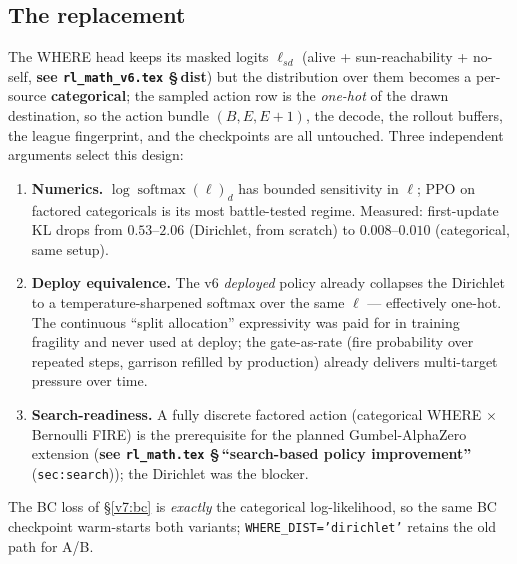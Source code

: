 \documentclass[11pt]{article}
\newcommand{\softmax}{\operatorname{softmax}}
\newcommand{\cd}[1]{\texttt{#1}}
\newcommand{\rlref}[2]{\textbf{see \texttt{rl\_math.tex} \S\,``#1''} (\texttt{#2})}
\newcommand{\vsixref}[1]{\textbf{see \texttt{rl\_math\_v6.tex} \S\,#1}}
\begin{document}
\subsection{The replacement}
The WHERE head keeps its masked logits $\ell_{sd}$ (alive + sun-reachability + no-self,
\vsixref{dist}) but the distribution over them becomes a per-source \textbf{categorical};
the sampled action row is the \emph{one-hot} of the drawn destination, so the action bundle
$(B,E,E{+}1)$, the decode, the rollout buffers, the league fingerprint, and the checkpoints are all
untouched. Three independent arguments select this design:
\begin{enumerate}[leftmargin=2em]
\item \textbf{Numerics.} $\log\softmax(\ell)_{d}$ has bounded sensitivity in $\ell$; PPO on
factored categoricals is its most battle-tested regime. Measured: first-update KL drops from
$0.53$--$2.06$ (Dirichlet, from scratch) to $0.008$--$0.010$ (categorical, same setup).
\item \textbf{Deploy equivalence.} The v6 \emph{deployed} policy already collapses the Dirichlet to
a temperature-sharpened softmax over the same $\ell$ --- effectively one-hot. The continuous
``split allocation'' expressivity was paid for in training fragility and never used at deploy; the
gate-as-rate (fire probability over repeated steps, garrison refilled by production) already
delivers multi-target pressure over time.
\item \textbf{Search-readiness.} A fully discrete factored action (categorical WHERE $\times$
Bernoulli FIRE) is the prerequisite for the planned Gumbel-AlphaZero extension
(\rlref{search-based policy improvement}{sec:search}); the Dirichlet was the blocker.
\end{enumerate}
The BC loss of \S\ref{v7:bc} is \emph{exactly} the categorical log-likelihood, so the same BC
checkpoint warm-starts both variants; \cd{WHERE\_DIST='dirichlet'} retains the old path for A/B.
\end{document}
